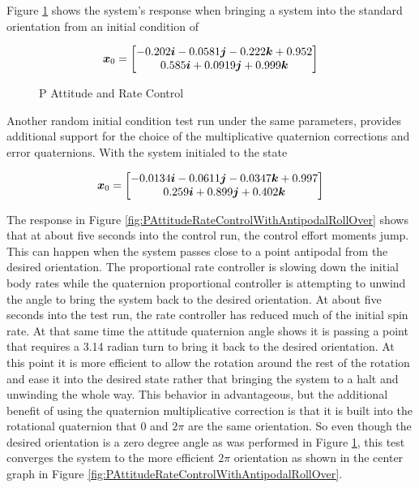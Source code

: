 Figure \ref{fig:PAttitudeRateControl} shows the system's response when bringing a system into the standard orientation from an initial condition of

\begin{equation}
  \boldsymbol{x}_0 = \begin{bmatrix} -0.202 \boldsymbol{i} -0.0581 \boldsymbol{j} -0.222 \boldsymbol{k} +0.952 \\ 0.585 \boldsymbol{i} +0.0919 \boldsymbol{j} +0.999 \boldsymbol{k} \end{bmatrix}
\end{equation}

\begin{figure}[H]
  \centerline{}
  \caption{P Attitude and Rate Control}
  \label{fig:PAttitudeRateControl}
\end{figure}

Another random initial condition test run under the same parameters, provides additional support for the choice of the multiplicative quaternion corrections and error quaternions.  With the system initialed to the state

\begin{equation}
  \boldsymbol{x}_0 = \begin{bmatrix} -0.0134 \boldsymbol{i} -0.0611 \boldsymbol{j} -0.0347 \boldsymbol{k} +0.997 \\ 0.259 \boldsymbol{i} +0.899 \boldsymbol{j} +0.402 \boldsymbol{k} \end{bmatrix}
\end{equation}

The response in Figure \ref{fig:PAttitudeRateControlWithAntipodalRollOver} shows that at about five seconds into the control run, the control effort moments jump.  This can happen when the system passes close to a point antipodal from the desired orientation.  The proportional rate controller is slowing down the initial body rates while the quaternion proportional controller is attempting to unwind the angle to bring the system back to the desired orientation.  At about five seconds into the test run, the rate controller has reduced much of the initial spin rate.  At that same time the attitude quaternion angle shows it is passing a point that requires a 3.14 radian turn to bring it back to the desired orientation.  At this point it is more efficient to allow the rotation around the rest of the rotation and ease it into the desired state rather that bringing the system to a halt and unwinding the whole way.  This behavior in advantageous, but the additional benefit of using the quaternion multiplicative correction is that it is built into the rotational quaternion that 0 and $2\pi$ are the same orientation.  So even though the desired orientation is a zero degree angle as was performed in Figure \ref{fig:PAttitudeRateControl}, this test converges the system to the more efficient $2\pi$ orientation as shown in the center graph in Figure \ref{fig:PAttitudeRateControlWithAntipodalRollOver}.

